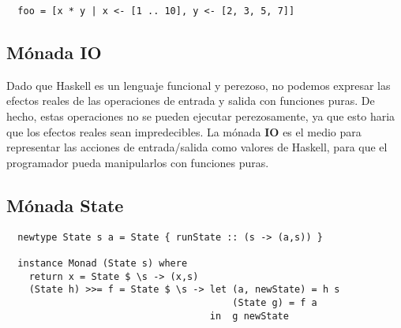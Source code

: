 \begin{lstlisting}
  foo = [x * y | x <- [1 .. 10], y <- [2, 3, 5, 7]]
\end{lstlisting}


\subsection{Mónada IO} %

Dado que Haskell es un lenguaje funcional y perezoso, no podemos expresar las
efectos reales de las operaciones de entrada y salida con funciones puras. De
hecho, estas operaciones no se pueden ejecutar perezosamente, ya que esto
haria que los efectos reales sean impredecibles. La mónada \textbf{IO} es el
medio para representar las acciones de entrada/salida como valores de Haskell,
para que el programador pueda manipularlos con funciones puras.



\subsection{Mónada State} %
\label{sub:m_nada_state}



\begin{lstlisting}
  newtype State s a = State { runState :: (s -> (a,s)) }

  instance Monad (State s) where
    return x = State $ \s -> (x,s)
    (State h) >>= f = State $ \s -> let (a, newState) = h s
                                        (State g) = f a
                                    in  g newState
\end{lstlisting}


\label{sub:m_nada_io}


